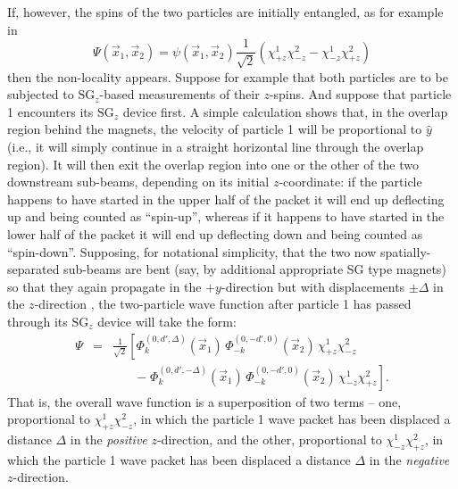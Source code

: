 \documentclass[aps,prc,onecolumn,letterpaper,floatfix,12pt]{revtex4}
\begin{document}
If, however, the spins of the two particles are initially entangled, as for
example in
\begin{equation}
\Psi(\vec{x}_1,\vec{x}_2) = \psi(\vec{x}_1,\vec{x}_2)
\frac{1}{\sqrt{2}} \left( \chi^1_{+z}\chi^2_{-z} - \chi^1_{-z} \chi^2_{+z}\right)
\label{ent}
\end{equation}
then the non-locality appears.  Suppose for example that both
particles are to be subjected to $\text{SG}_z$-based measurements of their
$z$-spins.  And suppose that particle 1 encounters its
$\text{SG}_z$ device first.  A simple calculation shows that, in the
overlap region behind the magnets, the velocity of particle 1 will be
proportional to $\hat{y}$ (i.e., it will simply continue in a straight
horizontal line through the overlap region).  It will then exit the
overlap region into one or the other of the two downstream sub-beams,
depending on its initial $z$-coordinate:  if
the particle happens to have started in the upper half of the packet
it will end up deflecting up and being counted as ``spin-up'', whereas
if it happens to have started in the lower half of the packet it will
end up deflecting down and being counted as ``spin-down''.
Supposing, for notational simplicity, that the two now
spatially-separated sub-beams are bent (say, by additional appropriate
SG type magnets) so that they again propagate in the $+y$-direction
but with displacements $\pm \Delta$ in the $z$-direction \cite{delta}, the
two-particle wave function after particle 1 has passed through its
$\text{SG}_z$ device will take the form:
\begin{eqnarray}
\Psi \! &=& \! \frac{1}{\sqrt{2}} \left[ 
\Phi_k^{(0,d',\Delta)} (\vec{x}_1) \, \Phi_{-k}^{(0,-d',0)}
(\vec{x}_2) \, \chi^1_{+z} \chi^2_{-z} \right. \\
&& \; \; \; \; \; \; \; \left. - \; \Phi_k^{(0,d',-\Delta)} (\vec{x}_1) \,
  \Phi_{-k}^{(0,-d',0)} (\vec{x}_2) \, \chi^1_{-z} \chi^2_{+z} \right]. \nonumber
\end{eqnarray}
That is, the overall wave function is a superposition of two terms --
one, proportional to $\chi^1_{+z} \chi^2_{-z}$, in which the particle 1 wave
packet has been displaced a distance $\Delta$ in the \emph{positive}
$z$-direction, and the other, proportional to $\chi^1_{-z} \chi^2_{+z}$, in
which the particle 1 wave packet has been displaced a distance
$\Delta$ in the \emph{negative} $z$-direction.
\end{document}
